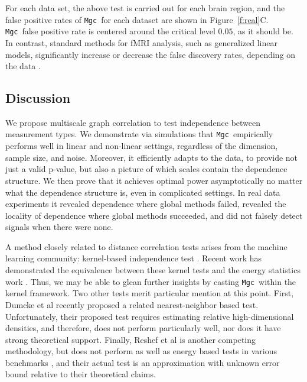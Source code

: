 \documentclass[11pt]{article}
\providecommand{\sct}[1]{{\sc \texttt{#1}}}
\newcommand{\Mgc}{\sct{Mgc}}
\begin{document}
For each data set, the above test is carried out for each brain region, and the false positive rates of \Mgc~for each dataset are shown in Figure~\ref{f:real}C. %
\Mgc~false positive rate is centered around the critical level $0.05$, as it should be.
In contrast,  standard methods for fMRI analysis, such as generalized linear models, significantly increase  or decrease the false discovery rates, depending on the data \cite{EklundKnutsson2012,Eklund2015}.

\subsection*{Discussion}
\label{conclu}

We propose multiscale graph correlation to test independence between measurement types.
We demonstrate via simulations that \Mgc~empirically performs well in linear and non-linear settings, regardless of the dimension, sample size, and noise.  Moreover, it efficiently adapts to the data, to provide not just a valid p-value, but also a picture of which scales contain the dependence structure. We then prove that it achieves optimal power asymptotically no matter what the dependence structure is, even in complicated settings.  In real data experiments it revealed dependence where global methods failed, revealed the locality of dependence where global methods succeeded, and did not falsely detect signals when there were none.



A method closely related to distance correlation tests arises from the machine learning community: kernel-based independence test  \cite{GrettonEtAl2005, GrettonGyorfi2010, GrettonEtAl2012}.  Recent work has demonstrated the equivalence between these kernel tests and the energy statistics work \cite{SejdinovicEtAl2013, RamdasEtAl2015}. Thus, we may be able to glean further insights by casting \Mgc~within the kernel framework.  Two other tests merit particular mention at this point.  First, Dumcke et al \cite{Dumcke2014} recently proposed a related nearest-neighbor based test.  Unfortunately, their proposed test requires estimating relative high-dimensional densities, and therefore, does not perform particularly well, nor does it have strong theoretical support.
Finally, Reshef et al \cite{Reshef2011} is another competing methodology, but does not perform as well as energy based tests in various benchmarks \cite{SimonTibshirani2012}, and their actual test is an approximation with unknown error bound relative to their theoretical claims.
\end{document}
